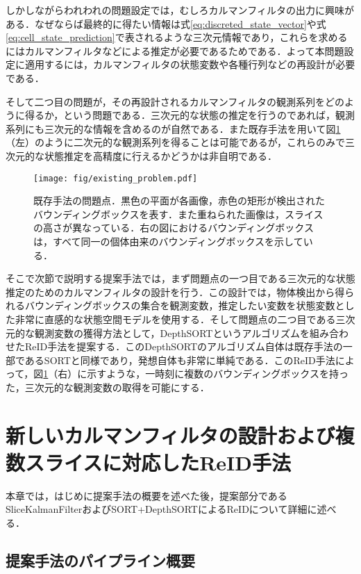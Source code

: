     しかしながらわれわれの問題設定では，むしろカルマンフィルタの出力に興味がある．なぜならば最終的に得たい情報は式\ref{eq:discreted_state_vector}や式\ref{eq:cell_state_prediction}で表されるような三次元情報であり，これらを求めるにはカルマンフィルタなどによる推定が必要であるためである．よって本問題設定に適用するには，カルマンフィルタの状態変数や各種行列などの再設計が必要である．

    そして二つ目の問題が，その再設計されるカルマンフィルタの観測系列をどのように得るか，という問題である．三次元的な状態の推定を行うのであれば，観測系列にも三次元的な情報を含めるのが自然である．また既存手法を用いて図\ref{fig:existing_problem}（左）のように二次元的な観測系列を得ることは可能であるが，これらのみで三次元的な状態推定を高精度に行えるかどうかは非自明である．

    \begin{figure}[t]
        \centering
        \texttt{[image: fig/existing\_problem.pdf]}
        \caption[既存手法の問題点]{既存手法の問題点．黒色の平面が各画像，赤色の矩形が検出されたバウンディングボックスを表す．また重ねられた画像は，スライスの高さが異なっている．右の図におけるバウンディングボックスは，すべて同一の個体由来のバウンディングボックスを示している．}
        \label{fig:existing_problem}
    \end{figure}

    そこで次節で説明する提案手法では，まず問題点の一つ目である三次元的な状態推定のためのカルマンフィルタの設計を行う．この設計では，物体検出から得られるバウンディングボックスの集合を観測変数，推定したい変数を状態変数とした非常に直感的な状態空間モデルを使用する．そして問題点の二つ目である三次元的な観測変数の獲得方法として，DepthSORTというアルゴリズムを組み合わせたReID手法を提案する．このDepthSORTのアルゴリズム自体は既存手法の一部であるSORTと同様であり，発想自体も非常に単純である．このReID手法によって，図\ref{fig:existing_problem}（右）に示すような，一時刻に複数のバウンディングボックスを持った，三次元的な観測変数の取得を可能にする．

\section{新しいカルマンフィルタの設計および複数スライスに対応したReID手法}
\label{sec:proposed_method}

本章では，はじめに提案手法の概要を述べた後，提案部分であるSliceKalmanFilterおよびSORT+DepthSORTによるReIDについて詳細に述べる．

    \subsection{提案手法のパイプライン概要}
    \label{subsec:proposed_pipeline}

